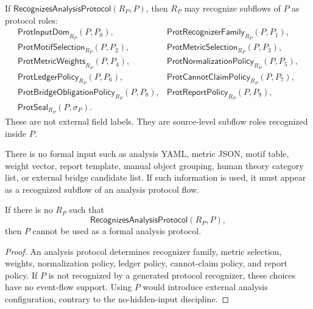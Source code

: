 \begin{definition}
\label{def:analysis-pipeline-protocol-subflows}
If $\mathsf{RecognizesAnalysisProtocol}(R_P,P)$, then $R_P$ may recognize subflows of $P$ as protocol roles:
$$
\begin{array}{ll}
  \mathsf{ProtInputDom}_{R_P}(P,P_0),&
  \mathsf{ProtRecognizerFamily}_{R_P}(P,P_1),\\
  \mathsf{ProtMotifSelection}_{R_P}(P,P_2),&
  \mathsf{ProtMetricSelection}_{R_P}(P,P_3),\\
  \mathsf{ProtMetricWeights}_{R_P}(P,P_4),&
  \mathsf{ProtNormalizationPolicy}_{R_P}(P,P_5),\\
  \mathsf{ProtLedgerPolicy}_{R_P}(P,P_6),&
  \mathsf{ProtCannotClaimPolicy}_{R_P}(P,P_7),\\
  \mathsf{ProtBridgeObligationPolicy}_{R_P}(P,P_8),&
  \mathsf{ProtReportPolicy}_{R_P}(P,P_9),\\
  \mathsf{ProtSeal}_{R_P}(P,\sigma_P).
\end{array}
$$
These are not external field labels. They are source-level subflow roles recognized inside $P$.
\end{definition}

\begin{principle}
\label{prin:analysis-pipeline-no-external-config}
There is no formal input such as analysis YAML, metric JSON, motif table, weight vector, report template, manual object grouping, human theory category list, or external bridge candidate list. If such information is used, it must appear as a recognized subflow of an analysis protocol flow.
\end{principle}

\begin{theorem}
\label{thm:analysis-pipeline-unrecognized-protocol-rejected}
If there is no $R_P$ such that
$$
  \mathsf{RecognizesAnalysisProtocol}(R_P,P),
$$
then $P$ cannot be used as a formal analysis protocol.
\end{theorem}

\begin{proof}
An analysis protocol determines recognizer family, metric selection, weights, normalization policy, ledger policy, cannot-claim policy, and report policy. If $P$ is not recognized by a generated protocol recognizer, these choices have no event-flow support. Using $P$ would introduce external analysis configuration, contrary to the no-hidden-input discipline.
\end{proof}

